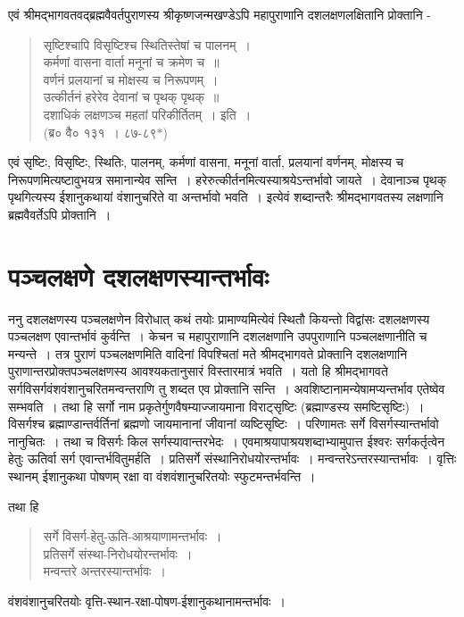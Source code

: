 {एवं श्रीमद्भागवतवद्ब्रह्मवैवर्तपुराणस्य श्रीकृष्णजन्मखण्डेऽपि महापुराणानि दशलक्षणलक्षितानि प्रोक्तानि -
\begin{verse}
सृष्टिश्चापि विसृष्टिश्च स्थितिस्तेषां च पालनम्~। \\
कर्मणां वासना वार्ता मनूनां च क्रमेण च~॥\\
वर्णनं प्रलयानां च मोक्षस्य च निरूपणम्~। \\
उत्कीर्तनं हरेरेव देवानां च पृथक् पृथक्~॥\\
दशाधिकं लक्षणञ्च महतां परिकीर्तितम्~। इति~।\\
\hspace{5cm}(ब्र० वै० १३१~। ८७-८९$*$)
\end{verse}
एवं सृष्टिः, विसृष्टिः, स्थितिः, पालनम्, कर्मणां वासना, मनूनां वार्ता, प्रलयानां वर्णनम्, मोक्षस्य च निरूपणमित्यष्टावुभयत्र समानान्येव सन्ति~। हरेरुत्कीर्तनमित्यस्याश्रयेऽन्तर्भावो जायते~। देवानाञ्च पृथक् पृथगित्यस्य ईशानुकथायां वंशानुचरिते वा अन्तर्भावो भवति~। इत्येवं शब्दान्तरैः श्रीमद्भागवतस्य लक्षणानि ब्रह्मवैवर्तेऽपि प्रोक्तानि~। 

\section*{पञ्चलक्षणे दशलक्षणस्यान्तर्भावः}

ननु दशलक्षणस्य पञ्चलक्षणेन विरोधात् कथं तयोः प्रामाण्यमित्येवं स्थितौ कियन्तो विद्वांसः दशलक्षणस्य पञ्चलक्षण एवान्तर्भावं कुर्वन्ति~। केचन च महापुराणानि दशलक्षणानि उपपुराणानि पञ्चलक्षणानीति च मन्यन्ते~। तत्र पुराणं पञ्चलक्षणमिति वादिनां विपश्चितां मते श्रीमद्भागवते प्रोक्तानि दशलक्षणानि पुराणान्तरप्रोक्तपञ्चलक्षणस्य आवश्यकतानुसारं विस्तारमात्रं भवति~। यतो हि श्रीमद्भागवते सर्गविसर्गवंशवंशानुचरितमन्वन्तराणि तु शब्दत एव प्रोक्तानि सन्ति~। अवशिष्टानामन्येषामप्यन्तर्भाव एतेष्वेव सम्भवति~। तथा हि सर्गो नाम प्रकृतेर्गुणवैषम्याज्जायमाना विराट्सृष्टिः (ब्रह्माण्डस्य समष्टिसृष्टिः)~। विसर्गश्च ब्रह्माण्डान्तर्वर्तिनां ब्रह्मणो जायमानानां जीवानां व्यष्टिसृष्टिः~। परिणामतः सर्गे विसर्गस्यान्तर्भावो नानुचितः~। तथा च विसर्गः किल सर्गस्यावान्तरभेदः~। एवमाश्रयापाश्रयशब्दाभ्यामुपात्त ईश्वरः सर्गकर्तृत्वेन हेतुः ऊतिर्वा सर्ग एवान्तर्भवितुमर्हति~। प्रतिसर्गे संस्थानिरोधयोरन्तर्भावः~। मन्वन्तरेऽन्तरस्यान्तर्भावः~। वृत्तिः स्थानम् ईशानुकथा पोषणम् रक्षा वा वंशवंशानुचरितयोः स्फुटमन्तर्भवन्ति~। 

तथा हि \
\begin{verse}
सर्गे विसर्ग-हेतु-ऊति-आश्रयाणामन्तर्भावः~। \\
प्रतिसर्गे संस्था-निरोधयोरन्तर्भावः~। \\
मन्वन्तरे अन्तरस्यान्तर्भावः~। 
\end{verse}
वंशवंशानुचरितयोः वृत्ति-स्थान-रक्षा-पोषण-ईशानुकथानामन्तर्भावः~। 

}
